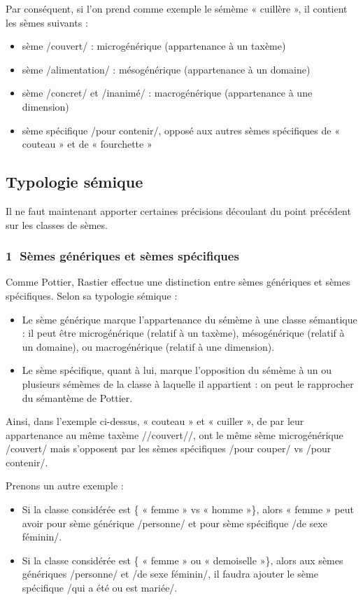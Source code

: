 Par conséquent, si l’on prend comme exemple le sémème « cuillère », il contient les sèmes suivants :
\begin{itemize}
\item sème /couvert/ : microgénérique (appartenance à un taxème)
\item sème /alimentation/ : mésogénérique (appartenance à un domaine)
\item sème /concret/ et /inanimé/ : macrogénérique (appartenance à une dimension)
\item sème spécifique /pour contenir/, opposé aux autres sèmes spécifiques de « couteau » et de « fourchette »
\end{itemize}

\subsection{Typologie sémique}
Il ne faut maintenant apporter certaines précisions découlant du point précédent sur les classes de sèmes.

\subsubsection*{\textcircled{\scriptsize 1} Sèmes génériques et sèmes spécifiques}
Comme Pottier, Rastier effectue une distinction entre sèmes génériques et sèmes spécifiques. Selon sa typologie sémique :
\begin{itemize}
\item Le sème générique marque l’appartenance du sémème à une classe sémantique : il peut être microgénérique (relatif à un taxème), mésogénérique (relatif à un domaine), ou macrogénérique (relatif à une dimension).
\item Le sème spécifique, quant à lui, marque l’opposition du sémème à un ou plusieurs sémèmes de la classe à laquelle il appartient : on peut le rapprocher du sémantème de Pottier.
\end{itemize}
Ainsi, dans l’exemple ci-dessus, « couteau » et « cuiller », de par leur appartenance au même taxème //couvert//, ont le même sème microgénérique /couvert/ mais s’opposent par les sèmes spécifiques /pour couper/ vs /pour contenir/.

Prenons un autre exemple :
\begin{itemize}
\item Si la classe considérée est \{ « femme » vs « homme »\}, alors « femme » peut avoir pour sème
 générique /personne/ et pour sème spécifique /de sexe féminin/.
\item Si la classe considérée est \{ « femme » ou « demoiselle »\}, alors aux sèmes génériques /personne/ et /de sexe féminin/, il faudra ajouter le sème spécifique /qui a été ou est mariée/.
\end{itemize}

